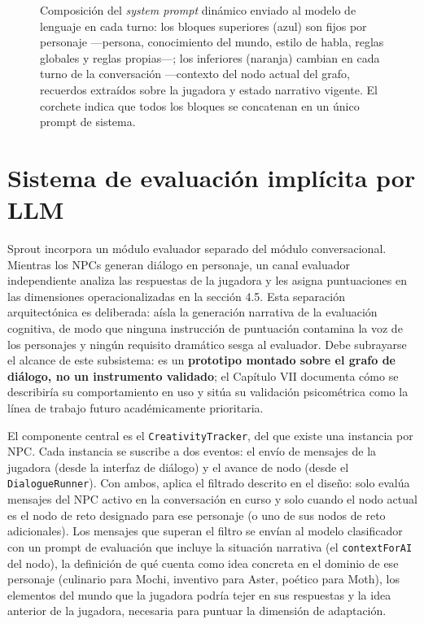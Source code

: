 \documentclass[12pt,twoside,titlepage]{report}
\begin{document}
\begin{figure}[H]
{%
}
\caption{Composición del \emph{system prompt} dinámico enviado al modelo de lenguaje en cada turno: los bloques superiores (azul) son fijos por personaje —persona, conocimiento del mundo, estilo de habla, reglas globales y reglas propias—; los inferiores (naranja) cambian en cada turno de la conversación —contexto del nodo actual del grafo, recuerdos extraídos sobre la jugadora y estado narrativo vigente. El corchete indica que todos los bloques se concatenan en un único prompt de sistema.}
\label{fig:prompt-stack}
\end{figure}


\section{Sistema de evaluación implícita por LLM}

Sprout incorpora un módulo evaluador separado del módulo conversacional. Mientras los NPCs generan diálogo en personaje, un canal evaluador independiente analiza las respuestas de la jugadora y les asigna puntuaciones en las dimensiones operacionalizadas en la sección 4.5. Esta separación arquitectónica es deliberada: aísla la generación narrativa de la evaluación cognitiva, de modo que ninguna instrucción de puntuación contamina la voz de los personajes y ningún requisito dramático sesga al evaluador. Debe subrayarse el alcance de este subsistema: es un \textbf{prototipo montado sobre el grafo de diálogo, no un instrumento validado}; el Capítulo VII documenta cómo se describiría su comportamiento en uso y sitúa su validación psicométrica como la línea de trabajo futuro académicamente prioritaria.

El componente central es el \texttt{CreativityTracker}, del que existe una instancia por NPC. Cada instancia se suscribe a dos eventos: el envío de mensajes de la jugadora (desde la interfaz de diálogo) y el avance de nodo (desde el \texttt{DialogueRunner}). Con ambos, aplica el filtrado descrito en el diseño: solo evalúa mensajes del NPC activo en la conversación en curso y solo cuando el nodo actual es el nodo de reto designado para ese personaje (o uno de sus nodos de reto adicionales). Los mensajes que superan el filtro se envían al modelo clasificador con un prompt de evaluación que incluye la situación narrativa (el \texttt{contextForAI} del nodo), la definición de qué cuenta como idea concreta en el dominio de ese personaje (culinario para Mochi, inventivo para Aster, poético para Moth), los elementos del mundo que la jugadora podría tejer en sus respuestas y la idea anterior de la jugadora, necesaria para puntuar la dimensión de adaptación.
\end{document}
